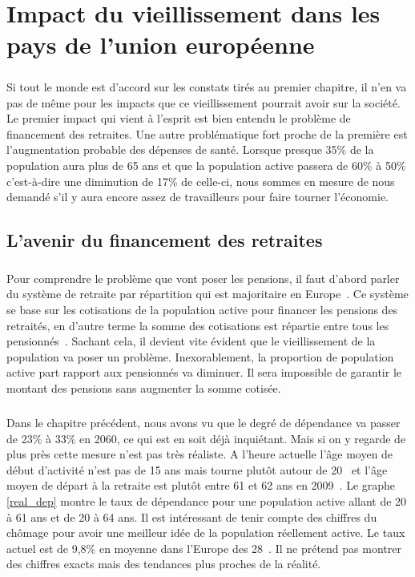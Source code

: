\chapter{Impact du vieillissement dans les pays de l'union européenne}
\paragraph{}Si tout le monde est d’accord sur les constats tirés au premier chapitre, il n’en va pas de même pour les impacts que ce vieillissement pourrait avoir sur la société. Le premier impact qui vient à l’esprit est bien entendu le problème de financement des retraites. Une autre problématique fort proche de la première est l’augmentation probable des dépenses de santé. Lorsque presque 35\% de la population aura plus de 65 ans et que la population active passera de 60\% à 50\% c’est-à-dire une diminution de 17\% de celle-ci, nous sommes en mesure de nous demandé s'il y aura encore assez de travailleurs pour faire tourner l’économie.  

\section{L'avenir du financement des retraites}
\paragraph{}Pour comprendre le problème que vont poser les pensions, il faut d’abord parler du système de retraite par répartition qui est majoritaire en Europe~\citep{system_retraite}. Ce système se base sur les cotisations de la population active pour financer les pensions des retraités, en d’autre terme la somme des cotisations est répartie entre tous les pensionnés~\citep{retraite_repartition}. Sachant cela, il devient vite évident que le vieillissement de la population va poser un problème. Inexorablement, la proportion de population active part rapport aux pensionnés va diminuer. Il sera impossible de garantir le montant des pensions sans augmenter la somme cotisée.  

\paragraph{}Dans le chapitre précédent, nous avons vu que le degré de dépendance va passer de 23\% à 33\% en 2060, ce qui est en soit déjà inquiétant. Mais si on y regarde de plus près cette mesure n’est pas très réaliste. A l’heure actuelle l’âge moyen de début d’activité n’est pas de 15 ans mais tourne plutôt autour de 20~\citep[pp.27]{eul} et l’âge moyen de départ à la retraite est plutôt entre 61 et 62 ans en 2009~\citep{eurocompar}. Le graphe \ref{real_dep} montre le taux de dépendance pour une population active allant de 20 à 61 ans et de 20 à 64 ans. Il est intéressant de tenir compte des chiffres du chômage pour avoir une meilleur idée de la population réellement active. Le taux actuel est de 9,8\% en moyenne dans l’Europe des 28~\citep{chaumage}. Il ne prétend pas montrer des chiffres exacts mais des tendances plus proches de la réalité. 



